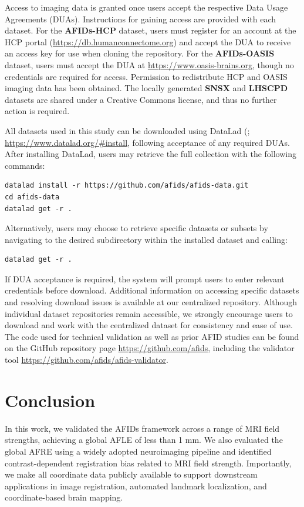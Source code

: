 Access to imaging data is granted once users accept the respective Data Usage Agreements (DUAs). Instructions for gaining access are provided with each dataset. For the \textbf{AFIDs-HCP} dataset, users must register for an account at the HCP portal (\url{https://db.humanconnectome.org}) and accept the DUA to receive an access key for use when cloning the repository. For the \textbf{AFIDs-OASIS} dataset, users must accept the DUA at \url{https://www.oasis-brains.org}, though no credentials are required for access. Permission to redistribute HCP and OASIS imaging data has been obtained. The locally generated \textbf{SNSX} and \textbf{LHSCPD} datasets are shared under a Creative Commons license, and thus no further action is required.

All datasets used in this study can be downloaded using DataLad (\cite{Halchenko2021-px}; \url{https://www.datalad.org/#install}, following acceptance of any required DUAs. After installing DataLad, users may retrieve the full collection with the following commands:
\begin{verbatim}
datalad install -r https://github.com/afids/afids-data.git
cd afids-data
datalad get -r .
\end{verbatim}

Alternatively, users may choose to retrieve specific datasets or subsets by navigating to the desired subdirectory within the installed dataset and calling:
\begin{verbatim}
datalad get -r .
\end{verbatim}

If DUA acceptance is required, the system will prompt users to enter relevant credentials before download. Additional information on accessing specific datasets and resolving download issues is available at our centralized repository. Although individual dataset repositories remain accessible, we strongly encourage users to download and work with the centralized dataset for consistency and ease of use. The code used for technical validation as well as prior AFID studies can be found on the GitHub repository page \url{https://github.com/afids}, including the validator tool \url{https://github.com/afids/afids-validator}.

\section{Conclusion}
In this work, we validated the AFIDs framework across a range of MRI field strengths, achieving a global AFLE of less than 1 mm. We also evaluated the global AFRE using a widely adopted neuroimaging pipeline and identified contrast-dependent registration bias related to MRI field strength. Importantly, we make all coordinate data publicly available to support downstream applications in image registration, automated landmark localization, and coordinate-based brain mapping.

